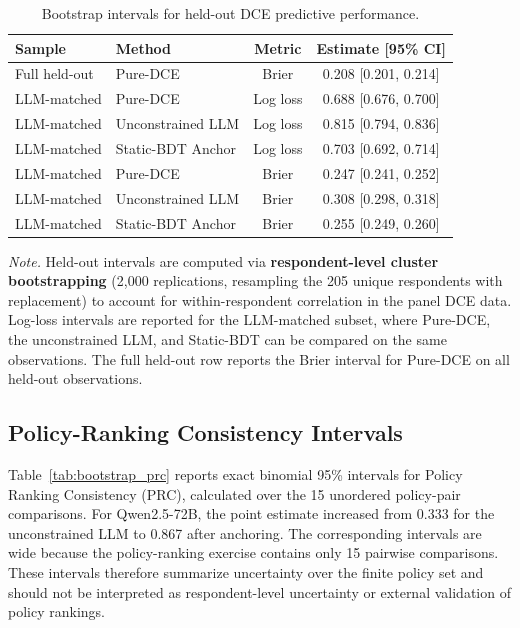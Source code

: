 \documentclass[11pt]{article}
\begin{document}
\begin{table}[h]
\centering
\caption{Bootstrap intervals for held-out DCE predictive performance.}
\label{tab:bootstrap_heldout}
\small
\begin{tabular}{l l c c}
\toprule
Sample & Method & Metric & Estimate [95\% CI] \\
\midrule
Full held-out & Pure-DCE & Brier & 0.208 [0.201, 0.214] \\
\midrule
LLM-matched & Pure-DCE & Log loss & 0.688 [0.676, 0.700] \\
LLM-matched & Unconstrained LLM & Log loss & 0.815 [0.794, 0.836] \\
LLM-matched & Static-BDT Anchor & Log loss & 0.703 [0.692, 0.714] \\
\midrule
LLM-matched & Pure-DCE & Brier & 0.247 [0.241, 0.252] \\
LLM-matched & Unconstrained LLM & Brier & 0.308 [0.298, 0.318] \\
LLM-matched & Static-BDT Anchor & Brier & 0.255 [0.249, 0.260] \\
\bottomrule
\end{tabular}

\vspace{0.4em}
\begin{minipage}{0.95\textwidth}
\small
\textit{Note.} Held-out intervals are computed via \textbf{respondent-level cluster bootstrapping} (2,000 replications, resampling the 205 unique respondents with replacement) to account for within-respondent correlation in the panel DCE data. Log-loss intervals are reported for the LLM-matched subset, where Pure-DCE, the unconstrained LLM, and Static-BDT can be compared on the same observations. The full held-out row reports the Brier interval for Pure-DCE on all held-out observations.
\end{minipage}
\end{table}

\subsection{Policy-Ranking Consistency Intervals}

Table~\ref{tab:bootstrap_prc} reports exact binomial 95\% intervals for Policy Ranking Consistency (PRC), calculated over the 15 unordered policy-pair comparisons. For Qwen2.5-72B, the point estimate increased from 0.333 for the unconstrained LLM to 0.867 after anchoring. The corresponding intervals are wide because the policy-ranking exercise contains only 15 pairwise comparisons. These intervals therefore summarize uncertainty over the finite policy set and should not be interpreted as respondent-level uncertainty or external validation of policy rankings.
\end{document}
